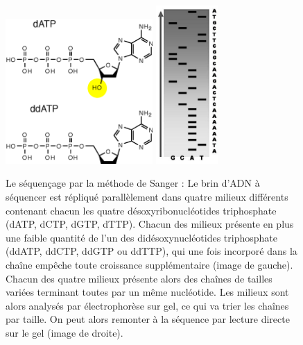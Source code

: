 \begin{figure}[H]
\begin{center}
\includegraphics[width=0.5\textwidth]{ddatp.png}\hspace{1.3cm} \includegraphics[width=0.21\textwidth]{gelelectrophoresis.jpg}
\vspace{0.5cm}

\caption[Séquencer par la méthode de Sanger]{Le séquençage par la méthode de Sanger : Le brin d'ADN à séquencer est répliqué parallèlement dans quatre milieux différents contenant chacun les quatre désoxyribonucléotides triphosphate (dATP, dCTP, dGTP, dTTP). Chacun des milieux présente en plus une faible quantité de l'un des didésoxynucléotides triphosphate (ddATP, ddCTP, ddGTP ou ddTTP), qui une fois incorporé dans la cha\^{i}ne empêche toute croissance supplémentaire (image de gauche). Chacun des quatre milieux présente alors des cha\^{i}nes de tailles variées terminant toutes par un même nucléotide. Les milieux sont alors analysés par électrophorèse sur gel, ce qui va trier les cha\^{i}nes par taille. On peut alors remonter à la séquence par lecture directe sur le gel (image de droite).}
\label{sangermethod}
\end{center}
\end{figure}



